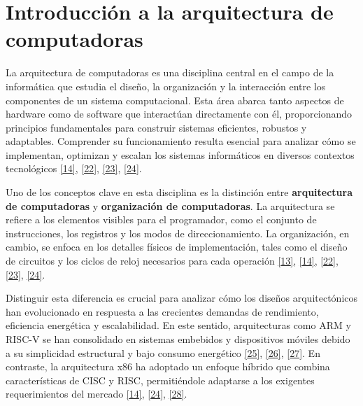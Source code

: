 \documentclass[12pt,oneside]{templates/unerthesis}
\begin{document}
\hypertarget{introducciuxf3n-a-la-arquitectura-de-computadoras}{%
\section{Introducción a la arquitectura de computadoras}\label{introducciuxf3n-a-la-arquitectura-de-computadoras}}

La arquitectura de computadoras es una disciplina central en el campo de la informática que estudia el diseño, la organización y la interacción entre los componentes de un sistema computacional. Esta área abarca tanto aspectos de hardware como de software que interactúan directamente con él, proporcionando principios fundamentales para construir sistemas eficientes, robustos y adaptables. Comprender su funcionamiento resulta esencial para analizar cómo se implementan, optimizan y escalan los sistemas informáticos en diversos contextos tecnológicos \protect\hyperlink{ref-stallings_computer_2021}{{[}14{]}}, \protect\hyperlink{ref-tanenbaum_structured_2016}{{[}22{]}}, \protect\hyperlink{ref-murdocca_principles_2000}{{[}23{]}}, \protect\hyperlink{ref-bryant2015computer}{{[}24{]}}.

Uno de los conceptos clave en esta disciplina es la distinción entre \textbf{arquitectura de computadoras} y \textbf{organización de computadoras}. La arquitectura se refiere a los elementos visibles para el programador, como el conjunto de instrucciones, los registros y los modos de direccionamiento. La organización, en cambio, se enfoca en los detalles físicos de implementación, tales como el diseño de circuitos y los ciclos de reloj necesarios para cada operación \protect\hyperlink{ref-hennessy2017computer}{{[}13{]}}, \protect\hyperlink{ref-stallings_computer_2021}{{[}14{]}}, \protect\hyperlink{ref-tanenbaum_structured_2016}{{[}22{]}}, \protect\hyperlink{ref-murdocca_principles_2000}{{[}23{]}}, \protect\hyperlink{ref-bryant2015computer}{{[}24{]}}.

Distinguir esta diferencia es crucial para analizar cómo los diseños arquitectónicos han evolucionado en respuesta a las crecientes demandas de rendimiento, eficiencia energética y escalabilidad. En este sentido, arquitecturas como ARM y RISC-V se han consolidado en sistemas embebidos y dispositivos móviles debido a su simplicidad estructural y bajo consumo energético \protect\hyperlink{ref-waterman_risc-v_2014}{{[}25{]}}, \protect\hyperlink{ref-harris2015digital}{{[}26{]}}, \protect\hyperlink{ref-null_essentials_2023}{{[}27{]}}. En contraste, la arquitectura x86 ha adoptado un enfoque híbrido que combina características de CISC y RISC, permitiéndole adaptarse a los exigentes requerimientos del mercado \protect\hyperlink{ref-stallings_computer_2021}{{[}14{]}}, \protect\hyperlink{ref-bryant2015computer}{{[}24{]}}, \protect\hyperlink{ref-patterson_computer_2014}{{[}28{]}}.
\end{document}
